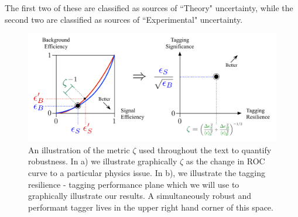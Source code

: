 \documentclass[11pt,letterpaper]{article}
\begin{document}
The first two of these are classified as sources of ``Theory" uncertainty, while the second two are classified as sources of ``Experimental" uncertainty.

\begin{figure}
\begin{center}
\includegraphics[width=1.0\columnwidth]{figures/roc_to_significance}
\end{center}
\caption{An illustration of the metric $\zeta$ used throughout the text to quantify robustness. In a) we illustrate graphically $\zeta$ as the change in ROC curve to a particular physics issue. In b), we illustrate the tagging resilience - tagging performance plane which we will use to graphically illustrate our results. A simultaneously robust and performant tagger lives in the upper right hand corner of this space. }
\label{fig:zeta_def}
\end{figure}
\end{document}
